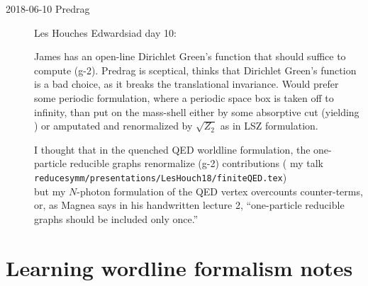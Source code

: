 \begin{description}
\item[2018-06-10 Predrag] Les Houches Edwardsiad day 10:

James has an open-line Dirichlet Green's function that should suffice
to compute (g-2). Predrag is sceptical, thinks that Dirichlet Green's function
is a bad choice, as it breaks the translational invariance. Would prefer
some periodic formulation, where a periodic space box is taken off to
infinity, than put on the mass-shell either by some absorptive cut
(yielding ) or amputated and renormalized by
$\sqrt{Z_2}$ as in LSZ formulation.

I thought that in the quenched QED worldline formulation, the
one-particle reducible graphs renormalize (g-2) contributions
( {my talk}\\
\texttt{reducesymm/presentations/LesHouch18/finiteQED.tex}) \\
but my $N$-photon formulation of the QED vertex overcounts counter-terms,
or, as Magnea says in his handwritten
 {lecture 2},
``one-particle reducible graphs should be included only once.''


\end{description}


\section{Learning wordline formalism notes}
\label{c-dailyBlogGX}

